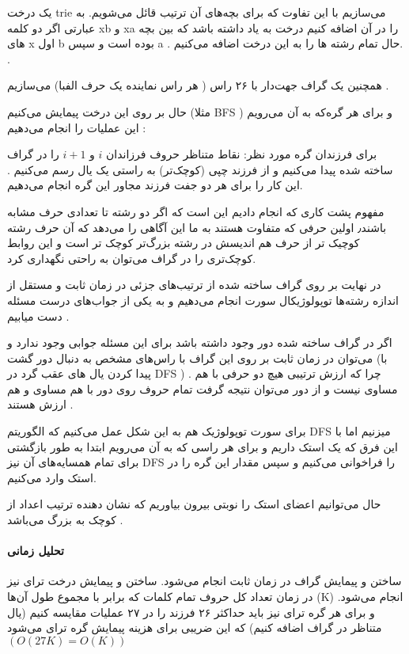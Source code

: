 
%	


یک درخت 
trie 
می‌سازیم با این تفاوت
که برای بچه‌های آن ترتیب 
قائل می‌شویم.
به عبارتی
اگر دو کلمه 
xb 
و 
xa 
را در آن اضافه کنیم درخت به یاد 
داشته باشد که بین بچه های 
x 
اول 
b 
بوده است و سپس 
a
.
حال تمام رشته ها را به این درخت اضافه می‌کنیم.
.

همچنین یک گراف جهت‌دار با ۲۶ راس 
( هر راس نماینده یک حرف الفبا) 
می‌سازیم
.

حال بر روی این درخت پیمایش می‌کنیم
(مثلا 
BFS
)
و برای هر گره‌که به آن می‌رویم این عملیات را انجام می‌دهیم
:

برای فرزندان گره مورد نظر:
نقاط متناظر حروف فرزاندان 
$i$ 
و
$i+1$
را در گراف ساخته شده پیدا می‌کنیم 
و
از فرزند چپی (کوچک‌تر) به راستی یک یال رسم می‌کنیم
.
این کار را برای هر دو جفت فرزند مجاور این گره انجام می‌دهیم.

مفهوم
 پشت کاری که انجام دادیم این است که اگر دو
 رشته تا تعدادی حرف مشابه باشند٫ 
 اولین حرفی که متفاوت هستند 
 به ما این آگاهی را می‌دهد 
 که آن حرف رشته کوچیک تر از حرف هم اندیسش در رشته بزرگ‌تر کوچک تر است
 و
  این روابط کوچک‌تری را در گراف می‌توان به راحتی نگهداری کرد.

  در نهایت بر روی گراف ساخته شده از ترتیب‌های جزئی در زمان ثابت و مستقل از اندازه رشته‌ها توپولوژیکال سورت انجام می‌دهیم 
  و به یکی از جواب‌های درست مسئله دست میابیم
  .

  اگر در گراف ساخته شده دور وجود داشته باشد برای این مسئله جوابی وجود ندارد 
  و می‌توان در زمان ثابت 
  بر روی این گراف با راس‌های مشخص به دنبال دور گشت
  (با پیدا کردن یال های عقب گرد در 
  DFS
  ) .
  چرا که ارزش ترتیبی هیچ دو حرفی با هم مساوی نیست 
  و 
  از دور می‌توان نتیجه گرفت تمام حروف روی دور با هم مساوی و هم ارزش هستند
  .


  برای سورت توپولوژیک هم 
  به این شکل عمل می‌کنیم که الگوریتم 
  DFS 
  میزنیم اما با این فرق که 
  یک استک داریم و برای هر راسی 
  که به آن می‌رویم ابتدا 
  به طور بازگشتی برای تمام همسایه‌های آن 
  نیز  
  DFS
  را فراخوانی می‌کنیم 
  و
   سپس مقدار این گره را
   در استک وارد می‌کنیم.

   حال می‌توانیم اعضای استک را نوبتی بیرون بیاوریم
   که نشان دهنده ترتیب اعداد از کوچک به بزرگ می‌باشد
   .


   \paragraph{تحلیل زمانی}
   ساختن و پیمایش گراف در زمان ثابت انجام می‌شود.
    ساختن و پیمایش درخت ترای نیز در زمان
    تعداد کل حروف تمام کلمات
    که برابر با مجموع طول آن‌ها 
    (K) 
    انجام می‌شود.
    و برای هر گره ترای نیز باید 
    حداکثر
    ۲۶ 
    فرزند را 
    در ۲۷ 
    عملیات مقایسه کنیم 
    (یال متناظر در گراف اضافه کنیم)
    که این ضریبی برای هزینه پیمایش گره ترای می‌شود
    $(O(27K) = O(K))$

